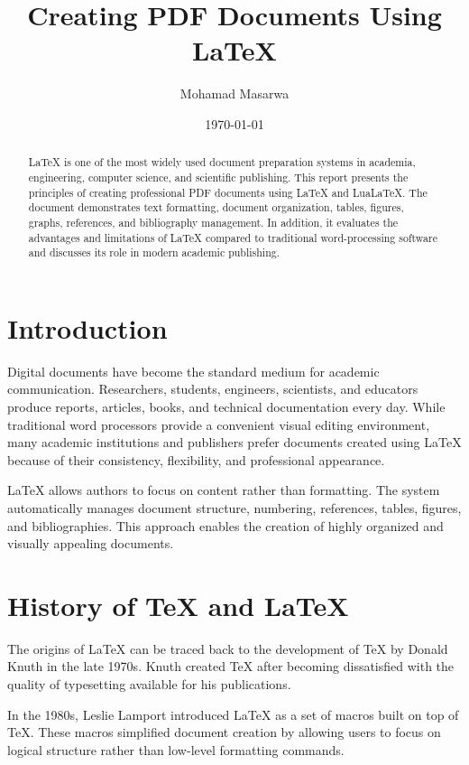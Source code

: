 \documentclass{academic-template}
\title{Creating PDF Documents Using LaTeX}
\author{Mohamad Masarwa}
\date{\today}
\begin{document}
\maketitle

\begin{abstract}
LaTeX is one of the most widely used document preparation systems in academia, engineering, computer science, and scientific publishing. This report presents the principles of creating professional PDF documents using LaTeX and LuaLaTeX. The document demonstrates text formatting, document organization, tables, figures, graphs, references, and bibliography management. In addition, it evaluates the advantages and limitations of LaTeX compared to traditional word-processing software and discusses its role in modern academic publishing.
\end{abstract}

\tableofcontents

\newpage

\section{Introduction}

Digital documents have become the standard medium for academic communication. Researchers, students, engineers, scientists, and educators produce reports, articles, books, and technical documentation every day. While traditional word processors provide a convenient visual editing environment, many academic institutions and publishers prefer documents created using LaTeX because of their consistency, flexibility, and professional appearance.

LaTeX allows authors to focus on content rather than formatting. The system automatically manages document structure, numbering, references, tables, figures, and bibliographies. This approach enables the creation of highly organized and visually appealing documents.

\section{History of TeX and LaTeX}

The origins of LaTeX can be traced back to the development of TeX by Donald Knuth in the late 1970s. Knuth created TeX after becoming dissatisfied with the quality of typesetting available for his publications.

In the 1980s, Leslie Lamport introduced LaTeX as a set of macros built on top of TeX. These macros simplified document creation by allowing users to focus on logical structure rather than low-level formatting commands.
\end{document}

